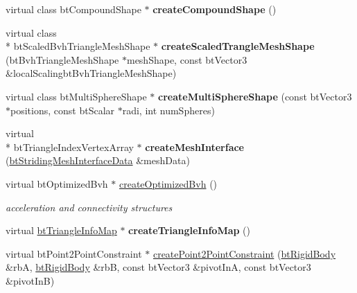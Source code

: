 \begin{DoxyCompactItemize}
\item 
\hypertarget{classbt_world_importer_a8ad0cae0836310f440cbd254405e3574}{virtual class bt\+Compound\+Shape $\ast$ {\bfseries create\+Compound\+Shape} ()}\label{classbt_world_importer_a8ad0cae0836310f440cbd254405e3574}

\item 
\hypertarget{classbt_world_importer_a1948e3926fa3ade6b585f1fb2111ccd7}{virtual class \\*
bt\+Scaled\+Bvh\+Triangle\+Mesh\+Shape $\ast$ {\bfseries create\+Scaled\+Trangle\+Mesh\+Shape} (bt\+Bvh\+Triangle\+Mesh\+Shape $\ast$mesh\+Shape, const bt\+Vector3 \&local\+Scalingbt\+Bvh\+Triangle\+Mesh\+Shape)}\label{classbt_world_importer_a1948e3926fa3ade6b585f1fb2111ccd7}

\item 
\hypertarget{classbt_world_importer_a43569391436f679c167aaf1c8eaa1002}{virtual class bt\+Multi\+Sphere\+Shape $\ast$ {\bfseries create\+Multi\+Sphere\+Shape} (const bt\+Vector3 $\ast$positions, const bt\+Scalar $\ast$radi, int num\+Spheres)}\label{classbt_world_importer_a43569391436f679c167aaf1c8eaa1002}

\item 
\hypertarget{classbt_world_importer_a68d6a56df3445f981cad8ad4813ca175}{virtual \\*
bt\+Triangle\+Index\+Vertex\+Array $\ast$ {\bfseries create\+Mesh\+Interface} (\hyperlink{structbt_striding_mesh_interface_data}{bt\+Striding\+Mesh\+Interface\+Data} \&mesh\+Data)}\label{classbt_world_importer_a68d6a56df3445f981cad8ad4813ca175}

\item 
\hypertarget{classbt_world_importer_a1774909c1d3256caadc6f6b96bdf1b9b}{virtual bt\+Optimized\+Bvh $\ast$ \hyperlink{classbt_world_importer_a1774909c1d3256caadc6f6b96bdf1b9b}{create\+Optimized\+Bvh} ()}\label{classbt_world_importer_a1774909c1d3256caadc6f6b96bdf1b9b}

\begin{DoxyCompactList}\small\item\em acceleration and connectivity structures \end{DoxyCompactList}\item 
\hypertarget{classbt_world_importer_aeb5e3bb603b53d413b4e053c5dc359eb}{virtual \hyperlink{structbt_triangle_info_map}{bt\+Triangle\+Info\+Map} $\ast$ {\bfseries create\+Triangle\+Info\+Map} ()}\label{classbt_world_importer_aeb5e3bb603b53d413b4e053c5dc359eb}

\item 
\hypertarget{classbt_world_importer_ae63f9f2794b0ba937b2bc5508a9ec8cf}{virtual bt\+Point2\+Point\+Constraint $\ast$ \hyperlink{classbt_world_importer_ae63f9f2794b0ba937b2bc5508a9ec8cf}{create\+Point2\+Point\+Constraint} (\hyperlink{classbt_rigid_body}{bt\+Rigid\+Body} \&rb\+A, \hyperlink{classbt_rigid_body}{bt\+Rigid\+Body} \&rb\+B, const bt\+Vector3 \&pivot\+In\+A, const bt\+Vector3 \&pivot\+In\+B)}\label{classbt_world_importer_ae63f9f2794b0ba937b2bc5508a9ec8cf}


\end{DoxyCompactItemize}
